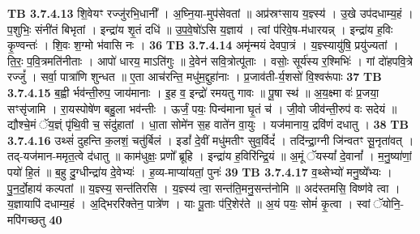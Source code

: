 \documentclass[17pt]{extarticle}
\begin{document}
{{{{{{{{{{{{{{{{{{{                  \newline
                                \textbf{ TB 3.7.4.13} \newline
                  शि॒वेयꣳ रज्जु॑रभि॒धानी᳚ । अ॒घ्नि॒या-मुप॑सेवतां ॥ अप्र॑स्रꣳसाय य॒ज्ञ्स्य॑ । उ॒खे उप॑दधाम्य॒हं । प॒शुभिः॒ संनी॑तं बिभृतां । इन्द्रा॑य शृ॒तं दधि॑ ॥ उ॒प॒वे॒षो॑ऽसि य॒ज्ञाय॑ । त्वां प॑रिवे॒ष-म॑धारयन्न् । इन्द्रा॑य ह॒विः कृ॒ण्वन्तः॑ । शि॒वः श॒ग्मो भ॑वासि नः । \textbf{ 36} \newline
                  \newline
                                \textbf{ TB 3.7.4.14} \newline
                  अमृ॑न्मयं देवपा॒त्रं । य॒ज्ञ्स्यायु॑षि॒ प्रयु॑ज्यतां । ति॒रः॒ प॒वि॒त्रमति॑नीताः । आपो॑ धारय॒ माऽति॑गुः ॥ दे॒वेन॑ सवि॒त्रोत्पू॑ताः । वसोः॒ सूर्य॑स्य र॒श्मिभिः॑ । गां दो॑हपवि॒त्रे रज्जुं᳚ । सर्वा॒ पात्रा॑णि शुन्धत ॥ ए॒ता आच॑रन्ति॒ मधु॑म॒द्दुहा॑नाः । प्र॒जाव॑ती-र्य॒शसो॑ वि॒श्वरू॑पाः \textbf{ 37} \newline
                  \newline
                                \textbf{ TB 3.7.4.15} \newline
                  ब॒ह्वी र्भव॑न्ती॒रुप॒ जाय॑मानाः । इ॒ह व॒ इन्द्रो॑ रमयतु गावः ॥ पू॒षा स्थ॑ ॥ अ॒य॒क्ष्मा वः॑ प्र॒जया॒ सꣳसृ॑जामि । रा॒यस्पोषे॑ण बहु॒ला भव॑न्तीः । ऊर्जं॒ पयः॒ पिन्व॑माना घृ॒तं च॑ । जी॒वो जीव॑न्ती॒रुप॑ वः सदेयं ॥ द्यौश्चे॒मं ॅय॒ज्ञ्ं पृ॑थि॒वी च॒ संदु॑हातां । धा॒ता सोमे॑न स॒ह वाते॑न वा॒युः । यज॑मानाय॒ द्रवि॑णं दधातु । \textbf{ 38} \newline
                  \newline
                                \textbf{ TB 3.7.4.16} \newline
                  उथ्सं॑ दुहन्ति क॒लशं॒ चतु॑र्बिलं । इडां᳚ दे॒वीं मधु॑मतीꣳ सुव॒र्विदं᳚ । तदि॑न्द्रा॒ग्नी जि॑न्वतꣳ सू॒नृता॑वत् । तद्-यज॑मान-ममृत॒त्वे द॑धातु ॥ काम॑धुक्षः॒ प्रणो᳚ ब्रूहि । इन्द्रा॑य ह॒विरि॑न्द्रि॒यं ॥ अ॒मूं ॅयस्यां᳚ दे॒वानां᳚ । म॒नु॒ष्या॑णां॒ पयो॑ हि॒तं ॥ ब॒हु दु॒ग्धीन्द्रा॑य दे॒वेभ्यः॑ । ह॒व्य-माप्या॑यतां॒ पुनः॑ \textbf{ 39} \newline
                  \newline
                                \textbf{ TB 3.7.4.17} \newline
                  व॒थ्सेभ्यो॑ मनु॒ष्ये᳚भ्यः । पु॒न॒र्दो॒हाय॑ कल्पतां ॥ य॒ज्ञ्स्य॒ सन्त॑तिरसि । य॒ज्ञ्स्य॑ त्वा॒ सन्त॑ति॒मनु॒सन्त॑नोमि ॥ अद॑स्तमसि॒ विष्ण॑वे त्वा । य॒ज्ञायापि॑ दधाम्य॒हं । अ॒द्भिररि॑क्तेन॒ पात्रे॑ण । याः पू॒ताः प॑रि॒शेर॑ते ॥ अ॒यं पयः॒ सोमं॑ कृ॒त्वा । स्वां ॅयोनि॒-मपि॑गच्छतु \textbf{ 40} \newline
}}}}}}}}}}}}}}}}}}}
\end{document}
